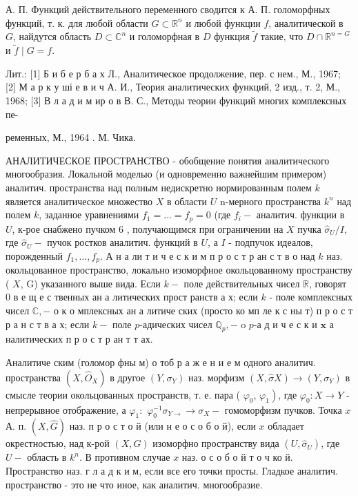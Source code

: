 \documentclass[10pt]{article}
\begin{document}
А. П. Функций действительного переменного сводится к А. П. голоморфных функций, т. к. для любой области $G \subset \mathbb{R}^{n}$ и любой функции $f$, аналитической в $G$, найдутся область $D \subset \mathbb{C}^{n}$ и голоморфная в $D$ функция $\tilde{f}$ такие, что $D \cap \mathbb{R}^{n=G}$ и $\tilde{f} \mid G=f$.



Лит.: [1] Б и б е р б а х Л., Аналитическое продолжение, пер. с нем., М., 1967; [2] М а р к у ші е в и ч А. И., Теория аналитических функций, 2 изд., т. 2, М., 1968; [3] В л а д и м ир о в В. С., Методы теории функций многих комплексных пе-

ременных, М., 1964 . М. Чика.



АНАЛИТИЧЕСКОЕ ПРОСТРАНСТВО - обобщение понятия аналитического многообразия. Локальной моделью (и одновременно важнейшим примером) аналитич. пространства над полным недискретно нормированным полем $k$ является аналитическое множество $X$ в области $U$ n-мерного пространства $k^{n}$ над полем $k$, заданное уравнениями $f_{1}=\ldots=f_{p}=0$ (где $f_{i}-$ аналитич. функции в $U$, к-рое снабжено пучком 6 , получающимся при ограничении на $X$ пучка $\widehat{\sigma}_{U} / I$, где $\widehat{\sigma}_{U}-$ пучок ростков аналитич. функций в $U$, а $I$ - подпучок идеалов, порожденный $f_{1}, \ldots, f_{p}$. А н а ли т и ч е с к и м п р о с т р ан с т в о над $k$ наз. окольцованное пространство, локально изоморфное окольцованному пространству ( $X$, G) указанного выше вида. Если $k-$ поле действительных чисел $\mathbb{R}$, говорят 0 в е щ е с твенных ан а литических прост ранств а х; если $k$ - поле комплексных чисел $\mathbb{C},-$ о к о мплексных ан а литиче ских (просто ко мп ле к с ны т) п р о с т р а н с т в а х; если $k-$ поле $p$-адических чисел $\mathbb{Q}_{p},-$ o $p$-а д и ч е с к и $\mathbf{x}$ а налитических п р о с т р ан т т ах.



Аналитиче ским (голомор фны м) о тоб р а ж е н и е м одного аналитич. пространства $\left(X, \hat{O}_{X}\right)$ в другое $\left(Y, \sigma_{Y}\right)$ наз. морфизм $(X, \hat{\sigma} X) \rightarrow\left(Y, \sigma_{Y}\right)$ в смысле теории окольцованных пространств, т. е. пара ( $\varphi_{0}$, $\left.\varphi_{1}\right)$, где $\varphi_{0}: X \rightarrow Y$ - непрерывное отображение, а $\varphi_{1}:$ $\varphi_{0}^{-1} \sigma_{Y \rightarrow} \rightarrow \sigma_{X}-$ гомоморфизм пучков. Точка $x$ А. п. $(X, \widehat{G})$ наз. п р о с т о й (или н е о с о б о й), если $x$ обладает окрестностью, над к-рой $(X, G)$ изоморфно пространству вида $\left(U, \widehat{\sigma}_{U}\right)$, где $U-$ область в $k^{n}$. В противном случае $x$ наз. о с о б о й т о ч ко й. Пространство наз. г л а д к и м, если все его точки просты. Гладкое аналитич. пространство - это не что иное, как аналитич. многообразие.
\end{document}
